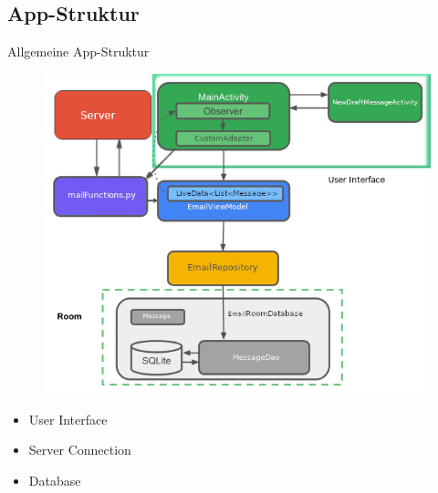 \documentclass[aspectratio=169]{beamer}
\begin{document}
\subsection{App-Struktur}
\begin{frame}[plain]{Allgemeine App-Struktur}
\begin{varwidth}{.3\textwidth}
    \pause
        \begin{figure}
            \centering
            \includegraphics[height=.8\textheight]{../maturText/media/AppStructureFull.png}
        \end{figure}
    \end{varwidth}
    \hfill
    \begin{varwidth}{.5\textwidth}
        \begin{itemize}\pause
            \item User Interface \pause
            \item Server Connection \pause
            \item Database
        \end{itemize}
    \end{varwidth} 
\end{frame}
\end{document}
